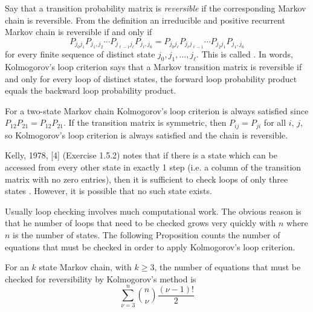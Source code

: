 \documentclass[12pt]{article}
\begin{document}
Say that a transition probability matrix is
\emph{reversible} if the
corresponding Markov chain is reversible.  From the definition an
irreducible and positive recurrent Markov chain is reversible if and
only if
\[
  P_{j_0 j_1} P_{j_1,j_2} \cdots P_{j_{\ell-1} j_\ell} P_{j_\ell, j_0} =
  P_{j_0 j_\ell} P_{j_\ell j_{\ell-1}} \cdots P_{j_2 j_1} P_{j_1, j_0}
\]
for every finite sequence of distinct state $j_0, j_1, \dots, j_\ell$.
This is called .
In words, Kolmogorov’s loop criterion says that a Markov transition matrix is
reversible if and only for every loop of distinct states, the forward loop probability product
equals the backward loop probability product.

For a two-state Markov chain Kolmogorov's loop criterion is always
satisfied since $P_{12} P_{21} = P_{12} P_{21}$.  If the transition
matrix is symmetric, then $P_{ij} = P_{ji}$ for all $i$, $j$, so
Kolmogorov's loop criterion is always satisfied and the chain is
reversible.  

Kelly, 1978, [4] (Exercise 1.5.2) notes that
if there is a state which can be accessed from every other state in exactly 1 step
(i.e. a column of the transition matrix with no zero entries), then it is sufficient to
check loops of only three states . However, it is possible that no
such state exists.

Usually loop checking involves much computational work.  The obvious
reason is that he number of loops that need
to be checked grows very quickly with $n$ where $n$ is the number of states. 
The following Proposition counts the number of equations that must be checked in order to
apply Kolmogorov’s loop criterion.

\begin{proposition}
For an $k$ state Markov chain, with $k \ge 3$, the number of
equations that must be checked for reversibility by Kolmogorov’s method is
\[
  \sum_{\nu=3}^n \binom{n}{\nu} \frac{(\nu-1)!}{2}
\]
\end{proposition}
\end{document}
